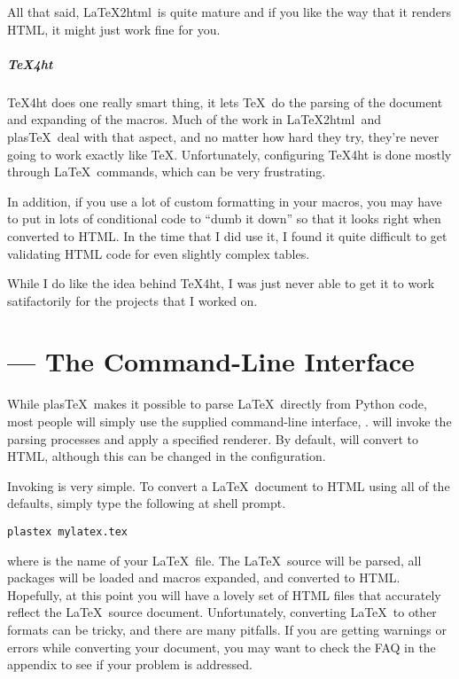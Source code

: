 \documentclass{manual}
\newcommand{\LaTeXtohtml}{{\LaTeX}2html}
\newcommand{\plasTeX}{plas\TeX}
\begin{document}
All that said, \LaTeXtohtml\ is quite mature and if you like the way that
it renders HTML, it might just work fine for you.

\paragraph{TeX4ht}

TeX4ht does one really smart thing, it lets \TeX\ do the parsing of the
document and expanding of the macros.  Much of the work in \LaTeXtohtml\
and \plasTeX\ deal with that aspect, and no matter how hard they try, 
they're never going to work exactly like \TeX.  Unfortunately, 
configuring TeX4ht is done mostly through \LaTeX\ commands, which 
can be very frustrating.  

In addition, if you use a lot of custom formatting in your macros, you 
may have to put in lots of conditional code to ``dumb it down'' so that
it looks right when converted to HTML.  In the time that I did use it,
I found it quite difficult to get validating HTML code for even slightly
complex tables.

While I do like the idea behind TeX4ht, I was just never able to get it
to work satifactorily for the projects that I worked on.


\chapter{\protect{} --- The Command-Line Interface}


While \plasTeX\ makes it possible to parse \LaTeX\ directly from Python
code, most people will simply use the supplied command-line interface, 
.   will invoke the parsing processes
and apply a specified renderer.  By default,  will
convert to HTML, although this can be changed in the \program{plastex}
configuration.  

Invoking  is very simple.  To convert a \LaTeX\ document 
to HTML using all of the defaults, simply type the following at shell prompt.

\begin{verbatim}
plastex mylatex.tex
\end{verbatim}

where  is the name of your \LaTeX\ file.  The 
\LaTeX\ source will be parsed, all packages will be loaded and macros 
expanded, and converted to HTML.  Hopefully, at this point you will have
a lovely set of HTML files that accurately reflect the \LaTeX\ source 
document.  Unfortunately, converting \LaTeX\ to other formats can be 
tricky, and there are many pitfalls.  If you are getting warnings or
errors while converting your document, you may want to check the FAQ
in the appendix to see if your problem is addressed.
\end{document}
